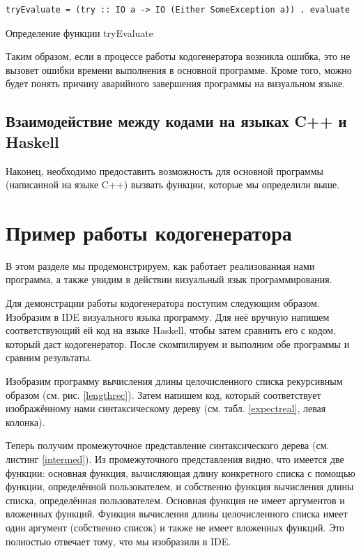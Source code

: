 \begin{ListingEnv}[h]
	\begin{lstlisting}
tryEvaluate = (try :: IO a -> IO (Either SomeException a)) . evaluate
	\end{lstlisting}
	\caption{Определение функции tryEvaluate}\label{tryeval}
\end{ListingEnv}
	
	Таким образом, если в процессе работы кодогенератора возникла ошибка, это не вызовет ошибки времени выполнения в основной программе. Кроме того, можно будет понять причину аварийного завершения программы на визуальном языке.
	
	\subsection{Взаимодействие между кодами на языках C++ и Haskell}	
	Наконец, необходимо предоставить возможность для основной программы (написанной на языке C++) вызвать функции, которые мы определили выше. 
	
\section{Пример работы кодогенератора}
В этом разделе мы продемонстрируем, как работает реализованная нами программа, а также увидим в действии визуальный язык программирования.

Для демонстрации работы кодогенератора поступим следующим образом. Изобразим в IDE визуального языка программу. Для неё вручную напишем соответствующий ей код на языке Haskell, чтобы затем сравнить его с кодом, который даст кодогенератор. После скомпилируем и выполним обе программы и сравним результаты.

Изобразим программу вычисления длины целочисленного списка рекурсивным образом (см. рис. \ref{lengthrec}). Затем напишем код, который соответствует изображённому нами синтаксическому дереву (см. табл. \ref{expectreal}, левая колонка). 

Теперь получим промежуточное представление синтаксического дерева (см. листинг \ref{intermed}). Из промежуточного представления видно, что имеется две функции: основная функция, вычисляющая длину конкретного списка с помощью функции, определённой пользователем, и собственно функция вычисления длины списка, определённая пользователем. Основная функция не имеет аргументов и вложенных функций. Функция вычисления длины целочисленного списка имеет один аргумент (собственно список) и также не имеет вложенных функций. Это полностью отвечает тому, что мы изобразили в IDE.

